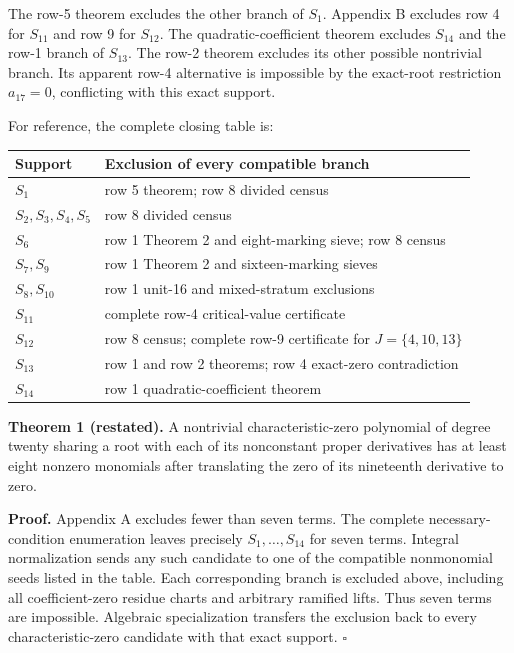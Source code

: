 \documentclass[
  british,
  10pt,
  a4paper,
]{article}
\newcounter{none} %
\begin{document}
The row-5 theorem excludes the other branch of \(S_1\). Appendix B
excludes row 4 for \(S_{11}\) and row 9 for \(S_{12}\). The
quadratic-coefficient theorem excludes \(S_{14}\) and the row-1 branch
of \(S_{13}\). The row-2 theorem excludes its other possible nontrivial
branch. Its apparent row-4 alternative is impossible by the exact-root
restriction \(a_{17}=0\), conflicting with this exact support.

For reference, the complete closing table is:

{\def\LTcaptype{none} %
\begin{longtable}[]{@{}
  >{\raggedright\arraybackslash}p{}
  >{\raggedright\arraybackslash}p{}@{}}
\toprule\noalign{}
\begin{minipage}[b]{\linewidth}\raggedright
Support
\end{minipage} & \begin{minipage}[b]{\linewidth}\raggedright
Exclusion of every compatible branch
\end{minipage} \\
\midrule\noalign{}
\endhead
\bottomrule\noalign{}
\endlastfoot
\(S_1\) & row 5 theorem; row 8 divided census \\
\(S_2,S_3,S_4,S_5\) & row 8 divided census \\
\(S_6\) & row 1 Theorem 2 and eight-marking sieve; row 8 census \\
\(S_7,S_9\) & row 1 Theorem 2 and sixteen-marking sieves \\
\(S_8,S_{10}\) & row 1 unit-16 and mixed-stratum exclusions \\
\(S_{11}\) & complete row-4 critical-value certificate \\
\(S_{12}\) & row 8 census; complete row-9 certificate for
\(J=\{4,10,13\}\) \\
\(S_{13}\) & row 1 and row 2 theorems; row 4 exact-zero contradiction \\
\(S_{14}\) & row 1 quadratic-coefficient theorem \\
\end{longtable}
}

\textbf{Theorem 1 (restated).} A nontrivial characteristic-zero
polynomial of degree twenty sharing a root with each of its nonconstant
proper derivatives has at least eight nonzero monomials after
translating the zero of its nineteenth derivative to zero.

\textbf{Proof.} Appendix A excludes fewer than seven terms. The complete
necessary-condition enumeration leaves precisely \(S_1,\ldots,S_{14}\)
for seven terms. Integral normalization sends any such candidate to one
of the compatible nonmonomial seeds listed in the table. Each
corresponding branch is excluded above, including all coefficient-zero
residue charts and arbitrary ramified lifts. Thus seven terms are
impossible. Algebraic specialization transfers the exclusion back to
every characteristic-zero candidate with that exact support. \(\square\)
\end{document}
